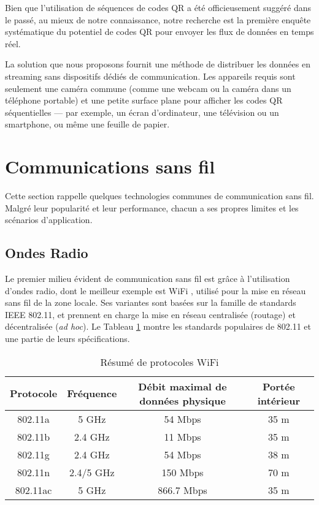 Bien que l'utilisation de séquences de codes QR a été officieusement suggéré dans le passé, au mieux de notre connaissance, notre recherche est la première enquête systématique du potentiel de codes QR pour envoyer les flux de données en temps réel.

La solution que nous proposons fournit une méthode de distribuer les données en streaming sans dispositifs dédiés de communication. Les appareils requis sont seulement une caméra commune (comme une webcam ou la caméra dans un téléphone portable) et une petite surface plane pour afficher les codes QR séquentielles --- par exemple, un écran d'ordinateur, une télévision ou un smartphone, ou même une feuille de papier.

\section{Communications sans fil}\label{sec:qr:reading} %

Cette section rappelle quelques technologies communes de communication sans fil. Malgré leur popularité et leur performance, chacun a ses propres limites et les scénarios d'application.

\subsection{Ondes Radio}

Le premier milieu évident de communication sans fil est grâce à l'utilisation d'ondes radio, dont le meilleur exemple est WiFi \citep{Comer:2008:CNI:1816918}, utilisé pour la mise en réseau sans fil de la zone locale. Ses variantes sont basées sur la famille de standards IEEE 802.11, et prennent en charge la mise en réseau centralisée (routage) et décentralisée (\textit{ad hoc}). Le Tableau \ref{tab:qr:wifi-protocol} montre les standards populaires de 802.11 et une partie de leurs spécifications.

\begin{table}[ht]
\begin{center}
\begin{tabular}{|c|c|c|c|}
\hline
Protocole &	Fréquence & Débit maximal de données physique	&	Portée intérieur \\
\hline
802.11a &	5 GHz &	54 Mbps &	35 m \\
\hline
802.11b &	2.4 GHz &	11 Mbps &	35 m\\
\hline
802.11g &	2.4 GHz &	54 Mbps &	38 m\\
\hline
802.11n &	2.4/5 GHz &	150 Mbps &	70 m\\
\hline
802.11ac &	5 GHz &	866.7 Mbps & 35 m\\
\hline
\end{tabular}
\caption{Résumé de protocoles WiFi \citep{theng2008ubiquitous,perahia2013next}}
\label{tab:qr:wifi-protocol}
\end{center}
\end{table}

